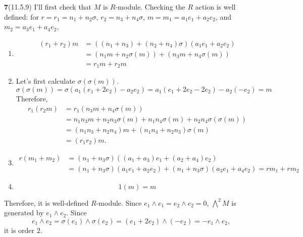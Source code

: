 \documentclass[a4paper, 12pt]{article}
\theoremstyle{Mydefinition}
\theoremstyle{Mytheorem}
\begin{document}
\noindent \textbf{7}(11.5.9)
I'll first check that $M$ is $R$-module. Checking the $R$ action is well defined: for $r = r_1 = n_1+n_2\sigma$, $r_2 = n_3+n_4\sigma$, $m = m_1=a_1e_1+a_2e_2$, and $m_2 = a_3e_1+a_4e_2$,
\begin{enumerate}
    \item 
    \begin{equation}
        \begin{split}
            (r_1+r_2)m &= ((n_1+n_3)+(n_2+n_4)\sigma)(a_1e_1+a_2e_2) \\
            &= (n_1m + n_2\sigma(m)) + (n_3m + n_4\sigma(m))\\
            &=r_1m+r_2m
        \end{split}
    \end{equation}
    \item 
    Let's first calculate $\sigma(\sigma(m))$.
    \begin{equation}
        \sigma(\sigma(m)) = \sigma(a_1(e_1+2e_2)-a_2e_2) = a_1(e_1+2e_2-2e_2)-a_2(-e_2) = m
    \end{equation}
    Therefore,
        \begin{equation}
        \begin{split}
            r_1(r_2m) &= r_1(n_3m + n_4\sigma(m))\\
            &=n_1n_3m + n_2n_3\sigma(m) + n_1n_4\sigma(m) + n_2n_4\sigma(\sigma(m))\\
            &=(n_1n_3+n_2n_4)m + (n_1n_4+n_2n_3)\sigma(m)\\
            &=(r_1r_2)m.
        \end{split}
    \end{equation}

    \item \begin{equation}
        \begin{split}
            r(m_1+m_2) &= (n_1+n_3\sigma)((a_1+a_3)e_1+(a_2+a_4)e_2) \\
            &= (n_1+n_3\sigma)(a_1e_1+a_2e_2) + (n_1+n_3\sigma)(a_3e_1+a_4e_2) = rm_1+rm_2
        \end{split}
    \end{equation}
    \item
    \begin{equation}
        1(m) = m
    \end{equation}
\end{enumerate}
Therefore, it is well-defined $R$-module. Since $e_1\wedge e_1 = e_2\wedge e_2 = 0$, $\bigwedge^2 M$ is generated by $e_1\wedge e_2$. Since
    \begin{equation}
        e_1\wedge e_2 = \sigma(e_1)\wedge \sigma(e_2) = (e_1+2e_2)\wedge (-e_2) = -e_1\wedge e_2,
    \end{equation}
    it is order $2$.\\
\end{document}
